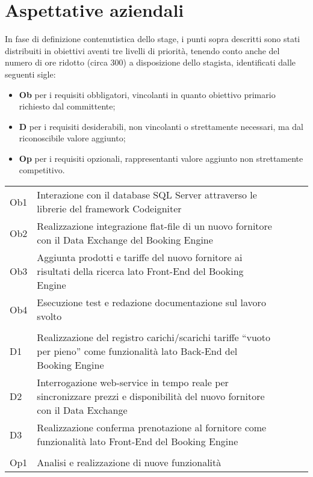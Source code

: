 \section{Aspettative aziendali}
In fase di definizione contenutistica dello stage, i punti sopra descritti sono stati distribuiti in obiettivi aventi tre livelli di priorità, tenendo conto anche del numero di ore ridotto (circa 300) a disposizione dello stagista, identificati dalle seguenti sigle:
\begin{itemize}
	\item \textbf{Ob} per i requisiti obbligatori, vincolanti in quanto obiettivo primario richiesto dal committente;
	\item \textbf{D} per i requisiti desiderabili, non vincolanti o strettamente necessari, ma dal riconoscibile valore aggiunto;
	\item \textbf{Op} per i requisiti opzionali, rappresentanti valore aggiunto non strettamente competitivo.
\end{itemize}

\begin{longtable}{
		@{}
		>{\raggedright}p{.5cm}
		p{10.5cm}
		>{\raggedleft}p{0.2cm}@{}
		>{\raggedright}p{0.2cm}
		p{8.5cm}
		@{}} 
	\hline
	\multicolumn{2}{|c|}{\textbf{Obbligatori}}\\
	\hline
	Ob1 & Interazione con il database SQL Server attraverso le librerie del framework Codeigniter\\
	\hline
	Ob2 & Realizzazione integrazione flat-file di un nuovo fornitore con il Data Exchange del Booking Engine\\
	\hline
	Ob3 & Aggiunta prodotti e tariffe del nuovo fornitore ai risultati della ricerca lato Front-End del Booking Engine\\
	\hline
	Ob4 & Esecuzione test e redazione documentazione sul lavoro svolto\\
	\hline
	\multicolumn{2}{|c|}{\textbf{Desiderabili}}\\
	\hline
	D1 & Realizzazione del registro carichi/scarichi tariffe “vuoto per pieno” come	funzionalità lato Back-End del Booking Engine\\
	\hline
	D2 & Interrogazione web-service in tempo reale per sincronizzare prezzi e disponibilità del nuovo fornitore con il Data Exchange\\
	\hline
	D3 & Realizzazione conferma prenotazione al fornitore come funzionalità lato Front-End del Booking Engine\\
	\hline
	\multicolumn{2}{|c|}{\textbf{Opzionali}}\\
	\hline
	Op1 & Analisi e realizzazione di nuove funzionalità\\
	\hline
\end{longtable}

